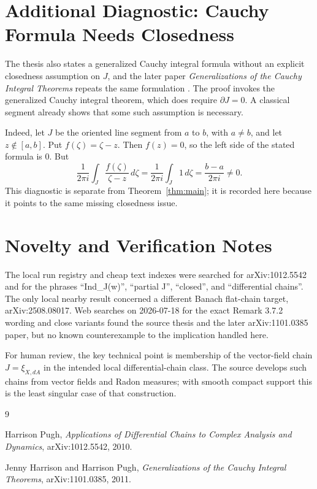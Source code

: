 \documentclass[11pt]{article}
\begin{document}
\section*{Additional Diagnostic: Cauchy Formula Needs Closedness}

The thesis also states a generalized Cauchy integral formula without an
explicit closedness assumption on \(J\), and the later paper
\emph{Generalizations of the Cauchy Integral Theorems} repeats the same
formulation \cite{HarrisonPugh}.  The proof invokes the generalized Cauchy
integral theorem, which does require \(\partial J=0\).  A classical segment
already shows that some such assumption is necessary.

Indeed, let \(J\) be the oriented line segment from \(a\) to \(b\), with
\(a\ne b\), and let \(z\notin [a,b]\).  Put \(f(\zeta)=\zeta-z\).  Then
\(f(z)=0\), so the left side of the stated formula is \(0\).  But
\[
  \frac{1}{2\pi i}\int_J \frac{f(\zeta)}{\zeta-z}\,d\zeta
  =
  \frac{1}{2\pi i}\int_J 1\,d\zeta
  =
  \frac{b-a}{2\pi i}\ne0.
\]
This diagnostic is separate from Theorem~\ref{thm:main}; it is recorded here
because it points to the same missing closedness issue.

\section*{Novelty and Verification Notes}

The local run registry and cheap text indexes were searched for arXiv:1012.5542
and for the phrases ``Ind\_J(w)'', ``partial J'', ``closed'', and
``differential chains''.  The only local nearby result concerned a different
Banach flat-chain target, arXiv:2508.08017.  Web searches on 2026-07-18 for
the exact Remark 3.7.2 wording and close variants found the source thesis and
the later arXiv:1101.0385 paper, but no known counterexample to the implication
handled here.

For human review, the key technical point is membership of the vector-field
chain \(J=\xi_{X,dA}\) in the intended local differential-chain class.  The
source develops such chains from vector fields and Radon measures; with smooth
compact support this is the least singular case of that construction.

\begin{thebibliography}{9}

Harrison Pugh,
\emph{Applications of Differential Chains to Complex Analysis and Dynamics},
arXiv:1012.5542, 2010.

Jenny Harrison and Harrison Pugh,
\emph{Generalizations of the Cauchy Integral Theorems},
arXiv:1101.0385, 2011.

\end{thebibliography}
\end{document}
